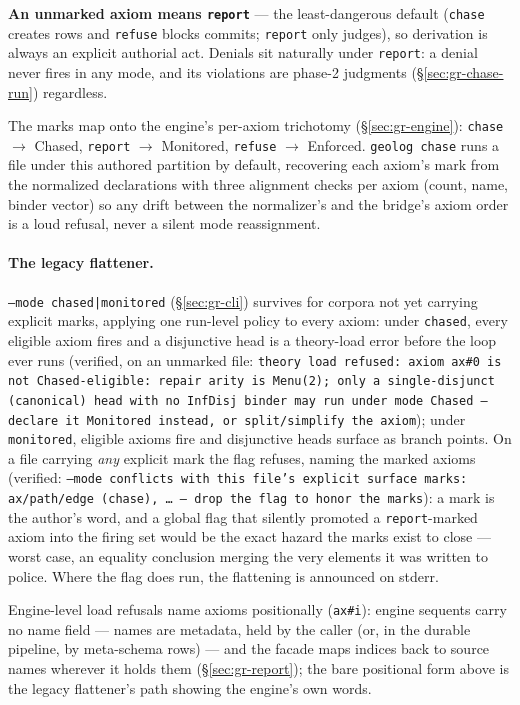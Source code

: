 \noindent \textbf{An unmarked axiom means \texttt{report}} — the
least-dangerous default (\texttt{chase} creates rows and
\texttt{refuse} blocks commits; \texttt{report} only judges), so
derivation is always an explicit authorial act. Denials sit naturally
under \texttt{report}: a denial never fires in any mode, and its
violations are phase-2 judgments (\S\ref{sec:gr-chase-run})
regardless.

The marks map onto the engine's per-axiom trichotomy
(\S\ref{sec:gr-engine}): \texttt{chase} $\to$ Chased, \texttt{report}
$\to$ Monitored, \texttt{refuse} $\to$ Enforced. \texttt{geolog
chase} runs a file under this authored partition by default,
recovering each axiom's mark from the normalized declarations with
three alignment checks per axiom (count, name, binder vector) so any
drift between the normalizer's and the bridge's axiom order is a
loud refusal, never a silent mode reassignment.

\paragraph{The legacy flattener.} \texttt{--mode chased|monitored}
(\S\ref{sec:gr-cli}) survives for corpora not yet carrying explicit
marks, applying one run-level policy to every axiom: under
\texttt{chased}, every eligible axiom fires and a disjunctive head is
a theory-load error before the loop ever runs (verified, on an
unmarked file: \texttt{theory load refused: axiom ax\#0 is not
Chased-eligible: repair arity is Menu(2); only a single-disjunct
(canonical) head with no InfDisj binder may run under mode Chased —
declare it Monitored instead, or split/simplify the axiom}); under
\texttt{monitored}, eligible axioms fire and disjunctive heads
surface as branch points. On a file carrying \emph{any} explicit mark
the flag refuses, naming the marked axioms (verified: \texttt{--mode
conflicts with this file's explicit surface marks: ax/path/edge
(chase), … — drop the flag to honor the marks}): a mark is the
author's word, and a global flag that silently promoted a
\texttt{report}-marked axiom into the firing set would be the exact
hazard the marks exist to close — worst case, an equality conclusion
merging the very elements it was written to police. Where the flag
does run, the flattening is announced on stderr.

\noindent Engine-level load refusals name axioms positionally
(\texttt{ax\#i}): engine sequents carry no name field — names are
metadata, held by the caller (or, in the durable pipeline, by
meta-schema rows) — and the facade maps indices back to source names
wherever it holds them (\S\ref{sec:gr-report}); the bare positional
form above is the legacy flattener's path showing the engine's own
words.

